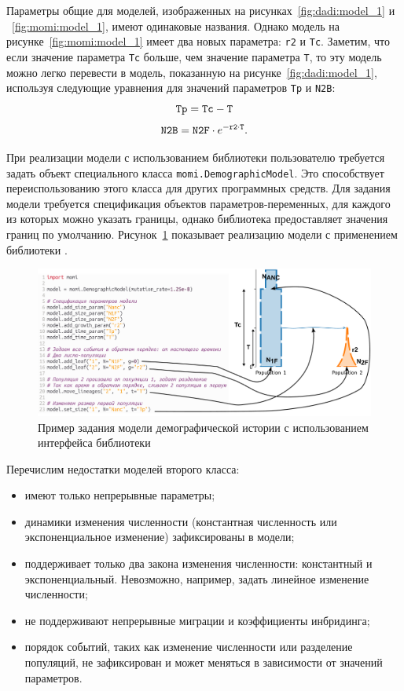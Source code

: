 Параметры общие для моделей, изображенных на рисунках~\ref{fig:dadi:model_1} и ~\ref{fig:momi:model_1}, имеют одинаковые названия.
Однако модель на рисунке~\ref{fig:momi:model_1} имеет два новых параметра: \texttt{r2} и \texttt{Tc}.
Заметим, что если значение параметра \texttt{Tc} больше, чем значение параметра \texttt{T}, то эту модель можно легко перевести в модель, показанную на рисунке~\ref{fig:dadi:model_1}, используя следующие уравнения для значений параметров \texttt{Tp} и \texttt{N2B}:
$$\text{\texttt{Tp}} = \text{\texttt{Tc}} - \text{\texttt{T}}$$ 
$$\text{\texttt{N2B}} = \text{\texttt{N2F}} \cdot e^{-\text{\texttt{r2}}\cdot \text{\texttt{T}}}.$$

При реализации модели с использованием библиотеки \momi пользователю требуется задать объект специального класса \texttt{momi.DemographicModel}.
Это способствует переиспользованию этого класса для других программных средств.
Для задания модели требуется спецификация объектов параметров-переменных, для каждого из которых можно указать границы, однако библиотека предоставляет значения границ по умолчанию.
Рисунок~\ref{fig:momi:model_spec} показывает реализацию модели с применением библиотеки \momi.\\
\begin{figure}[ht!]
    \centering
    \includegraphics[width=\linewidth]{images_2/momi_model.pdf}
    \caption{Пример задания модели демографической истории с
использованием интерфейса библиотеки \momi}
    \label{fig:momi:model_spec}
\end{figure}


Перечислим недостатки моделей второго класса:
\begin{itemize}
    \item имеют только непрерывные параметры;
    \item динамики изменения численности (константная численность или экспоненциальное изменение) зафиксированы в модели;
    \item поддерживает только два закона изменения численности: константный и экспоненциальный. Невозможно, например, задать линейное изменение численности;
    \item не поддерживают непрерывные миграции и коэффициенты инбридинга;
    \item порядок событий, таких как изменение численности или разделение популяций, не зафиксирован и может меняться в зависимости от значений параметров.\\
\end{itemize}

